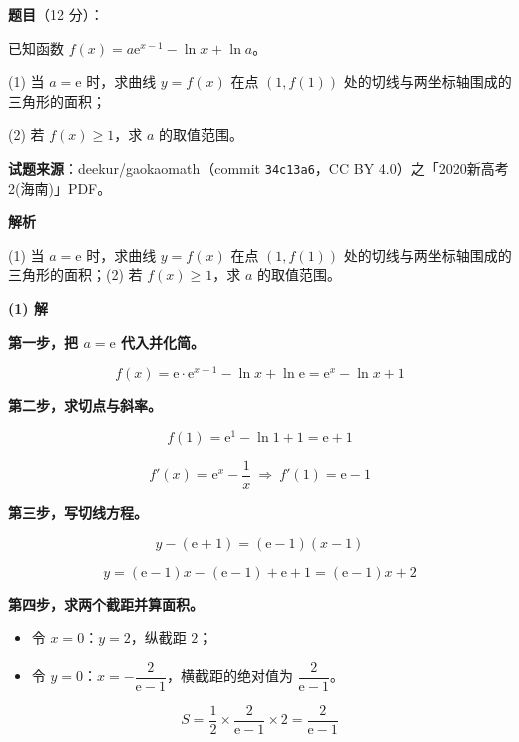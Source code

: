 \begin{answer}

\textbf{题目}（12 分）：

已知函数 $f(x)=a\mathrm e^{x-1}-\ln x+\ln a$。

  (1) 当 $a=\mathrm e$ 时，求曲线 $y=f(x)$ 在点 $(1,f(1))$ 处的切线与两坐标轴围成的三角形的面积；

  (2) 若 $f(x)\ge1$，求 $a$ 的取值范围。

\par\medskip

\begin{gktip}
\textbf{试题来源}：deekur/gaokaomath（commit \texttt{34c13a6}，CC BY 4.0）之「2020新高考2(海南)」PDF。
\end{gktip}

\textbf{解析}

  (1) 当 $a=\mathrm e$ 时，求曲线 $y=f(x)$ 在点 $(1,f(1))$ 处的切线与两坐标轴围成的三角形的面积；(2) 若 $f(x)\ge1$，求 $a$ 的取值范围。

\par\medskip

\textbf{(1) 解}

\textbf{第一步，把 $a=\mathrm e$ 代入并化简。}

\nopagebreak[4]
\[f(x)=\mathrm e\cdot\mathrm e^{x-1}-\ln x+\ln\mathrm e=\mathrm e^{x}-\ln x+1\]

\textbf{第二步，求切点与斜率。}

\nopagebreak[4]
\[f(1)=\mathrm e^{1}-\ln1+1=\mathrm e+1\]

\nopagebreak[4]
\[f'(x)=\mathrm e^{x}-\frac1x\ \Longrightarrow\ f'(1)=\mathrm e-1\]

\textbf{第三步，写切线方程。}

\nopagebreak[4]
\[y-(\mathrm e+1)=(\mathrm e-1)(x-1)\]

\nopagebreak[4]
\[y=(\mathrm e-1)x-(\mathrm e-1)+\mathrm e+1=(\mathrm e-1)x+2\]

\textbf{第四步，求两个截距并算面积。}

\begin{itemize}
\item 令 $x=0$：$y=2$，纵截距 $2$；
\item 令 $y=0$：$x=-\dfrac2{\mathrm e-1}$，横截距的绝对值为 $\dfrac2{\mathrm e-1}$。
\end{itemize}

\nopagebreak[4]
\[S=\frac12\times\frac2{\mathrm e-1}\times2=\frac2{\mathrm e-1}\]


\end{answer}
